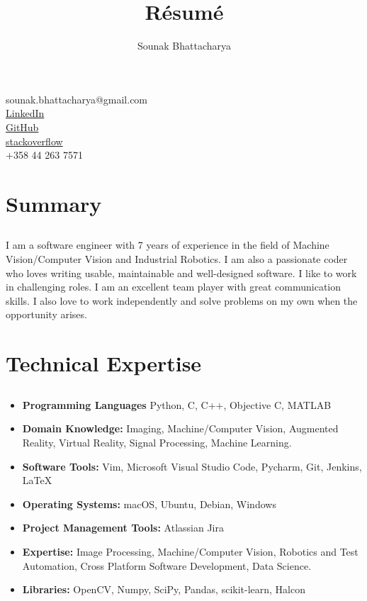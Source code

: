 \documentclass{article}
\renewcommand{\maketitle}{
\begin{center}
{\huge\bfseries
\theauthor}

\end{center}
}
\begin{document}
\title{R\'esum\'e}
\author{Sounak Bhattacharya}

\maketitle

\begin{center}
{\Large sounak.bhattacharya@gmail.com}\\
\href{https://www.linkedin.com/in/sounak-bhattacharya-b67718139/}{LinkedIn}\\
\href{https://github.com/bsounak}{GitHub}\\
\href{https://stackoverflow.com/users/4233113/sounak}{stackoverflow}\\
+358 44 263 7571
\end{center}

\section{Summary}
\subsection{}
I am a software engineer with 7 years of experience in the field of Machine
Vision/Computer Vision and Industrial Robotics. I am also a passionate coder
who loves writing usable, maintainable and well-designed software. I like to
work in challenging roles. I am an excellent team player with great
communication skills. I also love to work independently and solve problems on
my own when the opportunity arises.
\subsection{}

\section{Technical Expertise}
\subsection{}
\begin{itemize}[label={}]
  \itemsep0em 
  \item\textbf{Programming Languages} Python, C, C++, Objective C, MATLAB
  \item\textbf{Domain Knowledge:} Imaging, Machine/Computer Vision, Augmented Reality,
    Virtual Reality, Signal Processing, Machine Learning.
  \item\textbf{Software Tools:} Vim, Microsoft Visual Studio Code, Pycharm,
    Git, Jenkins, LaTeX
  \item\textbf{Operating Systems:} macOS, Ubuntu, Debian, Windows
  \item\textbf{Project Management Tools:} Atlassian Jira
  \item\textbf{Expertise:} Image Processing, Machine/Computer Vision, Robotics and Test Automation, Cross Platform Software Development, Data Science.
  \item\textbf{Libraries:} OpenCV, Numpy, SciPy, Pandas, scikit-learn, Halcon
\end{itemize}
\end{document}
